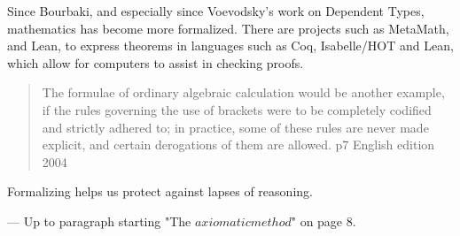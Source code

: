 \documentclass[]{scrartcl}
\begin{document}
Since Bourbaki, and especially since Voevodsky's work on Dependent Types, mathematics has become more formalized. There are projects such as MetaMath, and Lean, to express theorems in languages such as Coq, Isabelle/HOT and Lean, which allow for computers to assist in checking proofs.

\begin{quote}
	The formulae of ordinary algebraic calculation would be another example, if the rules governing the use of brackets were to be completely codified and strictly adhered to; in practice, some of these rules are never made explicit, and certain derogations of them are allowed. p7 English edition 2004
\end{quote}

Formalizing helps us protect against lapses of reasoning.

---
Up to paragraph starting "The $axiomatic method$" on page 8.
\end{document}
